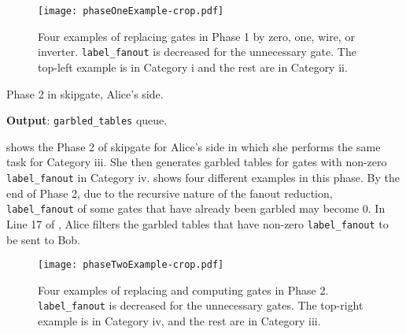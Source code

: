 \begin{figure}[h]
    \centering
    \texttt{[image: phaseOneExample-crop.pdf]}
    \caption{Four examples of replacing gates in Phase 1 by zero, one, wire, or inverter.
    \texttt{label\_fanout} is decreased for the unnecessary gate.
    The top-left example is in Category i and the rest are in Category ii.}
    \label{fig:phaseOneExample}
\end{figure}

\begin{algorithm}[]
\caption{Phase 2 in \gls{skipgate}, Alice's side.}\label{alg:phase2_alice}
\textbf{Output}: \texttt{garbled\_tables} queue.\\
\begin{algorithmic}[1]
		\ENDIF
	\ELSE {}
    \ENDIF
	\ENDIF
\ENDFOR
{}
\end{algorithmic}
\end{algorithm}

 shows the Phase 2 of \gls{skipgate} for Alice's side in which she performs the same task for Category iii.
She then generates garbled tables for gates with non-zero \texttt{label\_fanout} in Category iv.
 shows four different examples in this phase.
By the end of Phase 2, due to the recursive nature of the fanout reduction, \texttt{label\_fanout} of some gates that have already been garbled may become 0.
In Line 17 of , Alice filters the garbled tables that have non-zero \texttt{label\_fanout} to be sent to Bob.

\begin{figure}[h]
    \centering
    \texttt{[image: phaseTwoExample-crop.pdf]}
    \caption{Four examples of replacing and computing gates in Phase 2.
    		 \texttt{label\_fanout} is decreased for the unnecessary gates.
         The top-right example is in Category iv, and the rest are in Category iii.}
    \label{fig:phaseTwoExample}
\end{figure}

